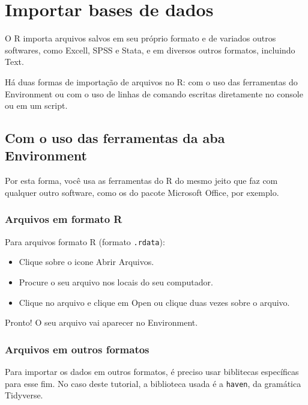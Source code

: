 \documentclass[
  brazil,
]{book}
\providecommand{\tightlist}{%
  \setlength{\itemsep}{0pt}\setlength{\parskip}{0pt}}
\begin{document}
\hypertarget{importar-bases-de-dados}{%
\chapter{Importar bases de dados}\label{importar-bases-de-dados}}

O R importa arquivos salvos em seu próprio formato e de variados outros softwares, como Excell, SPSS e Stata, e em diversos outros formatos, incluindo Text.

Há duas formas de importação de arquivos no R: com o uso das ferramentas do Environment ou com o uso de linhas de comando escritas diretamente no console ou em um script.

\hypertarget{com-o-uso-das-ferramentas-da-aba-environment}{%
\section{Com o uso das ferramentas da aba Environment}\label{com-o-uso-das-ferramentas-da-aba-environment}}

Por esta forma, você usa as ferramentas do R do mesmo jeito que faz com qualquer outro software, como os do pacote Microsoft Office, por exemplo.

\hypertarget{arquivos-em-formato-r}{%
\subsection{Arquivos em formato R}\label{arquivos-em-formato-r}}

Para arquivos formato R (formato \texttt{.rdata}):

\begin{itemize}
\tightlist
\item
  Clique sobre o icone Abrir Arquivos.
\item
  Procure o seu arquivo nos locais do seu computador.
\item
  Clique no arquivo e clique em Open ou clique duas vezes sobre o arquivo.
\end{itemize}

Pronto! O seu arquivo vai aparecer no Environment.

\hypertarget{arquivos-em-outros-formatos}{%
\subsection{Arquivos em outros formatos}\label{arquivos-em-outros-formatos}}

Para importar os dados em outros formatos, é preciso usar biblitecas específicas para esse fim. No caso deste tutorial, a biblioteca usada é a \texttt{haven}, da gramática Tidyverse.
\end{document}
